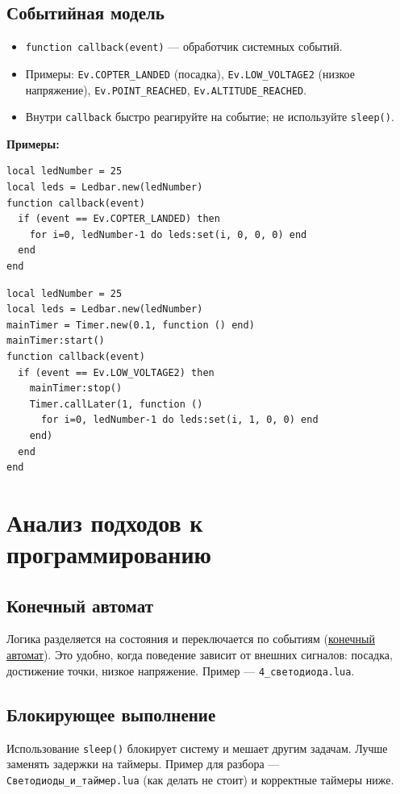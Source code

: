 \documentclass[a4paper,12pt]{article}
\begin{document}
\subsection{Событийная модель}
\begin{itemize}
  \item \verb|function callback(event)| — обработчик системных событий.
  \item Примеры: \verb|Ev.COPTER_LANDED| (посадка), \verb|Ev.LOW_VOLTAGE2| (низкое напряжение), \verb|Ev.POINT_REACHED|, \verb|Ev.ALTITUDE_REACHED|.
  \item Внутри \verb|callback| быстро реагируйте на событие; не используйте \verb|sleep()|.
\end{itemize}
\textbf{Примеры:}
\begin{lstlisting}[style=lua,caption={Посадка — выключить индикацию}]
local ledNumber = 25
local leds = Ledbar.new(ledNumber)
function callback(event)
  if (event == Ev.COPTER_LANDED) then
    for i=0, ledNumber-1 do leds:set(i, 0, 0, 0) end
  end
end
\end{lstlisting}
\begin{lstlisting}[style=lua,caption={Низкое напряжение — аварийный красный}]
local ledNumber = 25
local leds = Ledbar.new(ledNumber)
mainTimer = Timer.new(0.1, function () end)
mainTimer:start()
function callback(event)
  if (event == Ev.LOW_VOLTAGE2) then
    mainTimer:stop()
    Timer.callLater(1, function ()
      for i=0, ledNumber-1 do leds:set(i, 1, 0, 0) end
    end)
  end
end
\end{lstlisting}

\section{Анализ подходов к программированию}
\subsection{Конечный автомат}
Логика разделяется на состояния и переключается по событиям (\hyperlink{term:automaton}{конечный автомат}). Это удобно, когда поведение зависит от внешних сигналов: посадка, достижение точки, низкое напряжение. Пример — \verb|4_светодиода.lua|.
\subsection{Блокирующее выполнение}
Использование \verb|sleep()| блокирует систему и мешает другим задачам. Лучше заменять задержки на таймеры. Пример для разбора — \verb|Светодиоды_и_таймер.lua| (как делать не стоит) и корректные таймеры ниже.
\end{document}
